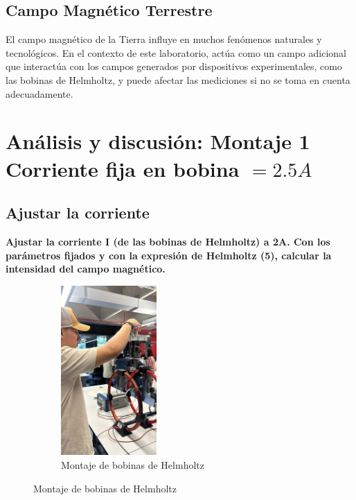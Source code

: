 \subsection{Campo Magnético Terrestre}
El campo magnético de la Tierra influye en muchos fenómenos naturales y tecnológicos. En el contexto de este laboratorio, actúa como un campo adicional que interactúa con los campos generados por dispositivos experimentales, como las bobinas de Helmholtz, y puede afectar las mediciones si no se toma en cuenta adecuadamente.

\section{Análisis y discusión: Montaje 1 Corriente fija en bobina $= 2.5A$}

\subsection{Ajustar la corriente}
\textbf{Ajustar la corriente I (de las bobinas de Helmholtz) a 2A. Con los parámetros fijados y
con la expresión de Helmholtz (5), calcular la intensidad del campo magnético.}

\begin{figure}[H]
  \centering
  \begin{subfigure}[b]{\textwidth}
      \centering
      \includegraphics[width=0.4\textwidth]{Figures/1. Content/montaje.jpeg}
      \caption{Montaje de bobinas de Helmholtz}
      \label{fig: Montaje 1}
  \end{subfigure}
  \hfill
\end{figure}

